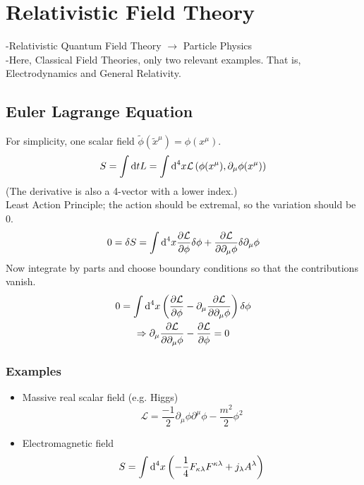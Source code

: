 \chapter{Relativistic Field Theory}
-Relativistic Quantum Field Theory $\rightarrow$ Particle Physics\\
-Here, Classical Field Theories, only two relevant examples. That is, Electrodynamics and General Relativity.

\section{Euler Lagrange Equation}
For simplicity, one scalar field $\tilde\phi(\tilde x^\mu) = \phi(x^\mu)$.
\begin{gather}
	S = \int \text dt L = \int \text d^4 x \mathcal L \left(\phi(x^\mu),\partial_\mu\phi(x^\mu)\right)
\end{gather}
(The derivative is also a 4-vector with a lower index.)\\
Least Action Principle; the action should be extremal, so the variation should be 0.
\begin{gather}
	0 = \delta S = \int \text d^4x \frac{\partial\mathcal L}{\partial\phi}\delta \phi + \frac{\partial\mathcal L}{\partial \partial_\mu\phi}\delta\partial_\mu\phi
\end{gather}
Now integrate by parts and choose boundary conditions so that the contributions vanish.
\begin{gather}
	0 = \int \text d^4 x \left(\frac{\partial\mathcal L}{\partial \phi} - \partial_\mu \frac{\partial\mathcal L}{\partial \partial_\mu\phi}\right)\delta\phi\\
	\Rightarrow \partial_\mu\frac{\partial\mathcal L}{\partial\partial_\mu\phi} - \frac{\partial\mathcal L}{\partial\phi} = 0
\end{gather}

\subsection{Examples}
\begin{itemize}
	\item Massive real scalar field (e.g. Higgs)
		$$
		\mathcal L = \frac{-1}{2}\partial_\mu \phi \partial^\mu \phi - \frac{m^2}{2}\phi^2
		$$
	\item Electromagnetic field
		$$
			S = \int\text d^4x\left(-\frac{1}{4}F_{\kappa\lambda}F^{\kappa\lambda} + j_\lambda A^\lambda\right)
		$$
\end{itemize}

